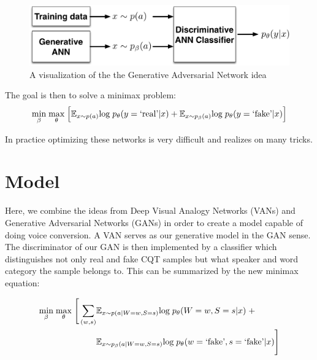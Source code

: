 \documentclass{article}
\begin{document}
\begin{figure}[h]
    \centering
    \includegraphics[scale=0.40]{adversarial_network.png}
    \caption{A visualization of the the Generative Adversarial Network idea}
    \label{adversarial_network}
\end{figure}

The goal is then to solve a minimax problem:
\begin{eqnarray*}
\underset{\beta}{\text{min}} \hspace{1mm} \underset{\theta}{\text{max}} \hspace{1mm} \Big[ \mathbb{E}_{x \sim p(a)} \text{log} \hspace{1mm} p_{\theta} (y=\text{`real’}|x) + \mathbb{E}_{x \sim p_{\beta}(a)} \text{log} \hspace{1mm} p_{\theta} (y=\text{`fake’}|x) \Big]
\end{eqnarray*}

In practice optimizing these networks is very difficult and realizes on many tricks.

\section{Model}
Here, we combine the ideas from Deep Visual Analogy Networks (VANs) and Generative Adversarial Networks (GANs) in order to create a model capable of doing voice conversion. A VAN serves as our generative model in the GAN sense. The discriminator of our GAN is then implemented by a classifier which distinguishes not only real and fake CQT samples but what speaker and word category the sample belongs to. This can be summarized by the new minimax equation:

\begin{eqnarray*}
\underset{\beta}{\text{min}} \hspace{1mm} \underset{\theta}{\text{max}} \hspace{1mm} \Bigg[ \sum_{(w,s)} &\mathbb{E}_{x \sim p(a|W=w,S=s)} \text{log} \hspace{1mm} p_{\theta} (W=w, S=s|x) \hspace{1mm} + \\
&\mathbb{E}_{x \sim p_{\beta}(a|W=w,S=s)} \text{log} \hspace{1mm} p_{\theta} (w=\text{`fake'}, s=\text{`fake'}|x) \Bigg]
\end{eqnarray*}
\end{document}
